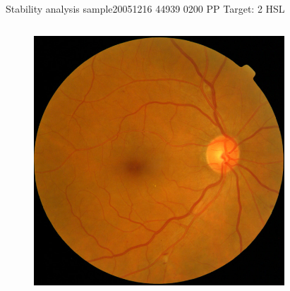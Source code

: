 \documentclass{beamer}
\begin{document}
\begin{frame}{Stability analysis sample}{20051216 44939 0200 PP Target: 2 HSL}
\begin{columns}
\begin{column}{0.3\textwidth}
	\begin{figure}[p]
		\centering
		\includegraphics[width=\textwidth]{chapter_stability/20051216_44939_0200_PP/20051216_44939_0200_PP.jpeg}
	\end{figure}	
\end{column}
\begin{column}{0.45\textwidth}  %
	\begin{figure}[p]
		\centering

\end{figure}
\end{column}
\end{columns}
\end{frame}
\end{document}
